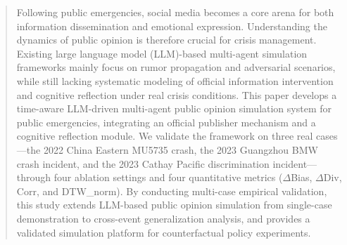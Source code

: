 \begin{abstract}
Following public emergencies, social media becomes a core arena for both information dissemination and emotional expression. Understanding the dynamics of public opinion is therefore crucial for crisis management. Existing large language model (LLM)-based multi-agent simulation frameworks mainly focus on rumor propagation and adversarial scenarios, while still lacking systematic modeling of official information intervention and cognitive reflection under real crisis conditions. This paper develops a time-aware LLM-driven multi-agent public opinion simulation system for public emergencies, integrating an official publisher mechanism and a cognitive reflection module. We validate the framework on three real cases---the 2022 China Eastern MU5735 crash, the 2023 Guangzhou BMW crash incident, and the 2023 Cathay Pacific discrimination incident---through four ablation settings and four quantitative metrics (\(\Delta\)Bias, \(\Delta\)Div, Corr, and DTW\_norm). By conducting multi-case empirical validation, this study extends LLM-based public opinion simulation from single-case demonstration to cross-event generalization analysis, and provides a validated simulation platform for counterfactual policy experiments.
\end{abstract}
